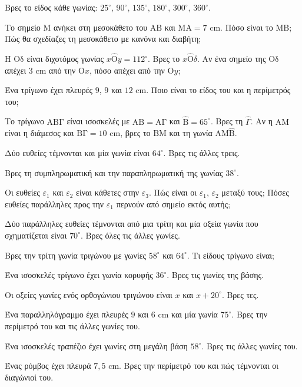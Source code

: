 
\ex Βρες το είδος κάθε γωνίας: $25^\circ$, $90^\circ$, $135^\circ$, $180^\circ$, $300^\circ$, $360^\circ$.

\ex Το σημείο $\mathrm{Μ}$ ανήκει στη μεσοκάθετο του $\mathrm{ΑΒ}$ και $\mathrm{ΜΑ}=7$ cm. Πόσο είναι το $\mathrm{ΜΒ}$; Πώς θα σχεδίαζες τη μεσοκάθετο με κανόνα και διαβήτη;

\ex Η $\mathrm{Οδ}$ είναι διχοτόμος γωνίας $x\hat{\mathrm{Ο}}y=112^\circ$. Βρες το $x\hat{\mathrm{Ο}}\delta$. Αν ένα σημείο της $\mathrm{Οδ}$ απέχει $3$ cm από την $\mathrm{Ο}x$, πόσο απέχει από την $\mathrm{Ο}y$;

\ex Ένα τρίγωνο έχει πλευρές $9$, $9$ και $12$ cm. Ποιο είναι το είδος του και η περίμετρός του;

\ex Το τρίγωνο $\mathrm{ΑΒΓ}$ είναι ισοσκελές με $\mathrm{ΑΒ}=\mathrm{ΑΓ}$ και $\hat{\mathrm{Β}}=65^\circ$. Βρες τη $\hat{\Gamma}$. Αν η $\mathrm{ΑΜ}$ είναι η διάμεσος και $\mathrm{ΒΓ}=10$ cm, βρες το $\mathrm{ΒΜ}$ και τη γωνία $\mathrm{ΑΜ}\hat{\mathrm{Β}}$.

\ex Δύο ευθείες τέμνονται και μία γωνία είναι $64^\circ$. Βρες τις άλλες τρεις.

\ex Βρες τη συμπληρωματική και την παραπληρωματική της γωνίας $38^\circ$.

\ex Οι ευθείες $\varepsilon_1$ και $\varepsilon_2$ είναι κάθετες στην $\varepsilon_3$. Πώς είναι οι $\varepsilon_1$, $\varepsilon_2$ μεταξύ τους; Πόσες ευθείες παράλληλες προς την $\varepsilon_1$ περνούν από σημείο εκτός αυτής;

\ex Δύο παράλληλες ευθείες τέμνονται από μια τρίτη και μία οξεία γωνία που σχηματίζεται είναι $70^\circ$. Βρες όλες τις άλλες γωνίες.

\ex Βρες την τρίτη γωνία τριγώνου με γωνίες $58^\circ$ και $64^\circ$. Τι είδους τρίγωνο είναι;

\ex Ένα ισοσκελές τρίγωνο έχει γωνία κορυφής $36^\circ$. Βρες τις γωνίες της βάσης.

\ex Οι οξείες γωνίες ενός ορθογώνιου τριγώνου είναι $x$ και $x+20^\circ$. Βρες τες.

\ex Ένα παραλληλόγραμμο έχει πλευρές $9$ και $6$ cm και μία γωνία $75^\circ$. Βρες την περίμετρό του και τις άλλες γωνίες του.

\ex Ένα ισοσκελές τραπέζιο έχει γωνίες στη μεγάλη βάση $58^\circ$. Βρες τις άλλες γωνίες του.

\ex Ένας ρόμβος έχει πλευρά $7{,}5$ cm. Βρες την περίμετρό του και πώς τέμνονται οι διαγώνιοί του.


